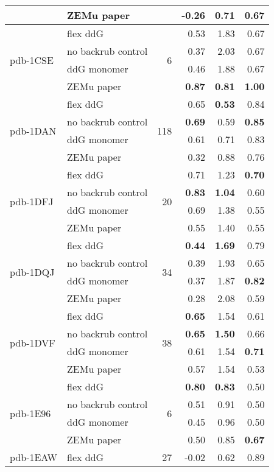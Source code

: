 \begin{longtable}{llrrrr}
 & ZEMu paper & & -0.26 & 0.71 & \textbf{0.67}  \\
\hline
 \multirow{ 4}{*}{pdb-1CSE} & flex ddG & \multirow{ 4}{*}{6} & 0.53 & 1.83 & 0.67  \\
 & no backrub control & & 0.37 & 2.03 & 0.67  \\
 & ddG monomer & & 0.46 & 1.88 & 0.67  \\
 & ZEMu paper & & \textbf{0.87} & \textbf{0.81} & \textbf{1.00}  \\
\hline
 \multirow{ 4}{*}{pdb-1DAN} & flex ddG & \multirow{ 4}{*}{118} & 0.65 & \textbf{0.53} & 0.84  \\
 & no backrub control & & \textbf{0.69} & 0.59 & \textbf{0.85}  \\
 & ddG monomer & & 0.61 & 0.71 & 0.83  \\
 & ZEMu paper & & 0.32 & 0.88 & 0.76  \\
\hline
 \multirow{ 4}{*}{pdb-1DFJ} & flex ddG & \multirow{ 4}{*}{20} & 0.71 & 1.23 & \textbf{0.70}  \\
 & no backrub control & & \textbf{0.83} & \textbf{1.04} & 0.60  \\
 & ddG monomer & & 0.69 & 1.38 & 0.55  \\
 & ZEMu paper & & 0.55 & 1.40 & 0.55  \\
\hline
 \multirow{ 4}{*}{pdb-1DQJ} & flex ddG & \multirow{ 4}{*}{34} & \textbf{0.44} & \textbf{1.69} & 0.79  \\
 & no backrub control & & 0.39 & 1.93 & 0.65  \\
 & ddG monomer & & 0.37 & 1.87 & \textbf{0.82}  \\
 & ZEMu paper & & 0.28 & 2.08 & 0.59  \\
\hline
 \multirow{ 4}{*}{pdb-1DVF} & flex ddG & \multirow{ 4}{*}{38} & \textbf{0.65} & 1.54 & 0.61  \\
 & no backrub control & & \textbf{0.65} & \textbf{1.50} & 0.66  \\
 & ddG monomer & & 0.61 & 1.54 & \textbf{0.71}  \\
 & ZEMu paper & & 0.57 & 1.54 & 0.53  \\
\hline
 \multirow{ 4}{*}{pdb-1E96} & flex ddG & \multirow{ 4}{*}{6} & \textbf{0.80} & \textbf{0.83} & 0.50  \\
 & no backrub control & & 0.51 & 0.91 & 0.50  \\
 & ddG monomer & & 0.45 & 0.96 & 0.50  \\
 & ZEMu paper & & 0.50 & 0.85 & \textbf{0.67}  \\
\hline
 \multirow{ 4}{*}{pdb-1EAW} & flex ddG & \multirow{ 4}{*}{27} & -0.02 & 0.62 & 0.89  \\

\end{longtable}
